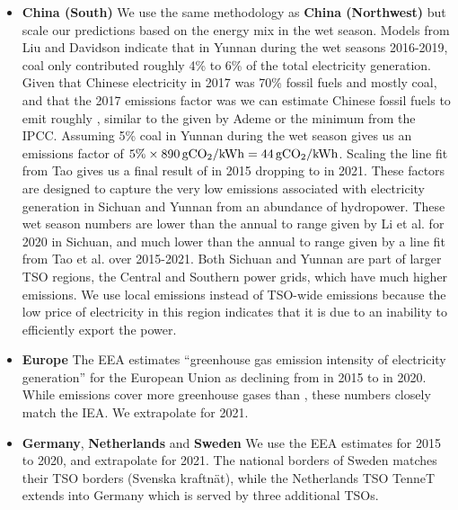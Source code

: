 \begin{appendices}
\begin{itemize}
    \item \textbf{China (South)} We use the same methodology as \textbf{China (Northwest)} but scale our predictions based on the energy mix in the wet season. Models from Liu and Davidson\cite{liu_china_2021} indicate that in Yunnan during the wet seasons 2016-2019, coal only contributed roughly 4\% to 6\% of the total electricity generation. Given that Chinese electricity in 2017 was 70\% fossil fuels\cite{us_eia_international_2021} and mostly coal, and that the 2017 emissions factor was \cite[67]{iea_co2_2019} we can estimate Chinese fossil fuels to emit roughly , similar to the  given by Ademe\cite{baude_key_2020} or the  minimum from the IPCC\cite{ipcc_annex_2014}. Assuming 5\% coal in Yunnan during the wet season gives us an emissions factor of $5\%\times\SI{890}{\gram CO\textsubscript{2}\per{\kilo\watt\hour}}=\SI{44}{\gram CO\textsubscript{2}\per{\kilo\watt\hour}}$. Scaling the line fit from Tao gives us a final result of  in 2015 dropping to  in 2021. These factors are designed to capture the very low emissions associated with electricity generation in Sichuan and Yunnan from an abundance of hydropower. These wet season numbers are lower than the annual  to  range given by Li et al. for 2020 in Sichuan, and much lower than the annual  to  range given by a line fit from Tao et al. over 2015-2021. Both Sichuan and Yunnan are part of larger TSO regions, the Central and Southern power grids, which have much higher emissions. We use local emissions instead of TSO-wide emissions because the low price of electricity in this region indicates that it is due to an inability to efficiently export the power.
    
    \item \textbf{Europe} The EEA\cite{eea_greenhouse_2021} estimates ``greenhouse gas emission intensity of electricity generation'' for the European Union as declining from  in 2015 to  in 2020. While \COtwoe{} emissions cover more greenhouse gases than \COtwo{}, these numbers closely match the IEA\cite{iea_development_2020}. We extrapolate for 2021.
    
    \item \textbf{Germany}, \textbf{Netherlands} and \textbf{Sweden} We use the EEA\cite{eea_greenhouse_2021} estimates for 2015 to 2020, and extrapolate for 2021. The national borders of Sweden matches their TSO borders (Svenska kraftnät), while the Netherlands TSO TenneT extends into Germany which is served by three additional TSOs\cite{wikipedia_contributors_european_2021}.
    

\end{itemize}
\end{appendices}
